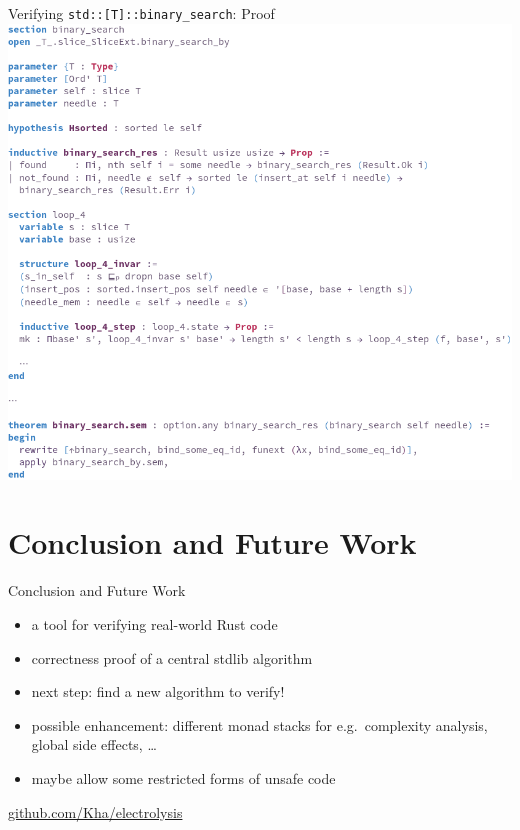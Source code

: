 \documentclass{beamer}
\begin{document}
\begin{frame}{Verifying \texttt{std::[T]::binary\_search}: Proof}
  \includegraphics[height=0.8\textheight,trim=0 0 0 20mm, clip]{proof}
\end{frame}

\section{Conclusion and Future Work}

\begin{frame}{Conclusion and Future Work}
  \begin{itemize}
    \item a tool for verifying real-world Rust code
    \item correctness proof of a central stdlib algorithm

    \hfill

    \item next step: find a new algorithm to verify!
    \item possible enhancement: different monad stacks for e.g.\ complexity analysis, global side effects, \dots
    \item maybe allow some restricted forms of unsafe code
  \end{itemize}

  \hfill

  \begin{center}
    \large\url{github.com/Kha/electrolysis}
  \end{center}
\end{frame}
\end{document}
